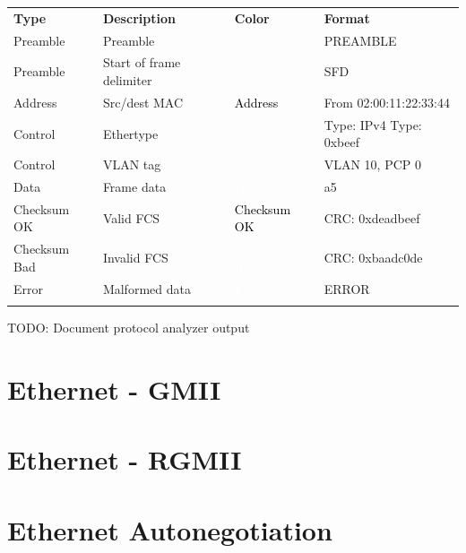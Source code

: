 \begin{tabularx}{16cm}{lllX}
\thickhline
\textbf{Type} & \textbf{Description} & \textbf{Color} & \textbf{Format} \\
\thickhline
Preamble & Preamble & \cellcolor{preamble}\textcolor{white}{Preamble} & PREAMBLE \\
\thickhline
Preamble & Start of frame delimiter & \cellcolor{preamble}\textcolor{white}{Preamble} & SFD \\
\thickhline
Address & Src/dest MAC & \cellcolor{address}\textcolor{black}{Address} & From 02:00:11:22:33:44 \\
\thickhline
Control & Ethertype & \cellcolor{control}\textcolor{white}{Control} & Type: IPv4 \newline Type: 0xbeef \\
\thickhline
Control & VLAN tag & \cellcolor{control}\textcolor{white}{Control} & VLAN 10, PCP 0 \\
\thickhline
Data & Frame data & \cellcolor{data}\textcolor{white}{Data} & a5 \\
\thickhline
Checksum OK & Valid FCS & \cellcolor{checksumok}\textcolor{black}{Checksum OK} & CRC: 0xdeadbeef \\
\thickhline
Checksum Bad & Invalid FCS & \cellcolor{checksumbad}\textcolor{white}{Checksum Bad} & CRC: 0xbaadc0de \\
\thickhline
Error & Malformed data & \cellcolor{error}\textcolor{white}{Error} & ERROR \\
\thickhline
\end{tabularx}

TODO: Document protocol analyzer output

\pagebreak
\section{Ethernet - GMII}

\pagebreak
\section{Ethernet - RGMII}

\pagebreak
\section{Ethernet Autonegotiation}

